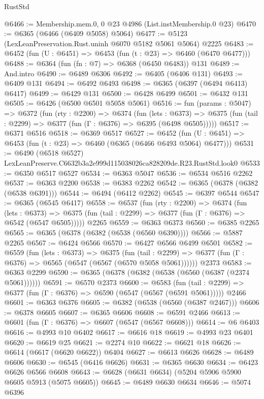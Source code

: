 \begin{lexlean}{RustStd}
\begin{coremodule}
@6466 := Membership.mem.{0, 0} @23 @4986 (List.instMembership.{0} @23)
@6470 := @6365 (@6466 (@6409 @5058) @5064)
@6477 := @5123 (LexLeanPreservation.Rust.uninh @6070 @5182 @5061 @5064) @2225
@6483 := @6452 (fun (U : @6451) => @6453 (fun (t : @23) => @6460 (@6470 @6477)))
@6488 := @6364 (fun (fn : @7) => @6368 (@6450 @6483)) @131
@6489 := And.intro
@6490 := @6489 @6306
@6492 := @6405 (@6406 @131)
@6493 := @6409 @131
@6494 := @6492 @6493
@6498 := @6365 (@6397 (@6494 @6413) @6417)
@6499 := @6429 @131
@6500 := @6428 @6499
@6501 := @6432 @131
@6505 := @6426 (@6500 @6501 @5058 @5061)
@6516 := fun (params : @5047) =>
  @6372
    (fun (rty : @2200) =>
    @6374
      (fun (lets : @6373) =>
      @6375 (fun (tail : @2299) => @6377 (fun (Γ : @6376) => @6395 (@6498 @6505)))))
@6517 := @6371 @6516
@6518 := @6369 @6517
@6527 := @6452 (fun (U : @6451) => @6453 (fun (t : @23) => @6460 (@6365 (@6466 @6493 @5064) @6477)))
@6531 := @6490 (@6518 @6527) LexLeanPreserve.C6632b3a2e999d115038026ca828209de.R23.RustStd.look0
@6533 := @6350 @6517 @6527
@6534 := @6363 @5047
@6536 := @6534 @6516 @2262
@6537 := @6363 @2200
@6538 := @6383 @2262
@6542 := @6365 (@6378 (@6382 (@6538 @6391)))
@6544 := @6494 (@6412 @2262)
@6545 := @6397 @6544
@6547 := @6365 (@6545 @6417)
@6558 := @6537
    (fun (rty : @2200) =>
    @6374
      (fun (lets : @6373) =>
      @6375 (fun (tail : @2299) => @6377 (fun (Γ : @6376) => @6542 (@6547 @6505)))))
    @2265
@6559 := @6363 @6373
@6560 := @6385 @2265
@6565 := @6365 (@6378 (@6382 (@6538 (@6560 @6390))))
@6566 := @5887 @2265
@6567 := @6424 @6566
@6570 := @6427 @6566 @6499 @6501
@6582 := @6559
    (fun (lets : @6373) =>
    @6375
      (fun (tail : @2299) => @6377 (fun (Γ : @6376) => @6565 (@6547 (@6567 (@6570 @5058 @5061))))))
    @2373
@6583 := @6363 @2299
@6590 := @6365 (@6378 (@6382 (@6538 (@6560 (@6387 (@2374 @5061))))))
@6591 := @6570 @2373
@6600 := @6583
    (fun (tail : @2299) => @6377 (fun (Γ : @6376) => @6590 (@6547 (@6567 (@6591 @5061)))))
    @2466
@6601 := @6363 @6376
@6605 := @6382 (@6538 (@6560 (@6387 @2467)))
@6606 := @6378 @6605
@6607 := @6365 @6606
@6608 := @6591 @2466
@6613 := @6601 (fun (Γ : @6376) => @6607 (@6547 (@6567 @6608)))
@6614 := @6 @6403
@6616 := @4993 @10 @6402
@6617 := @6616 @18
@6619 := @4993 @23 @6401
@6620 := @6619 @25
@6621 := @2274 @10
@6622 := @6621 @18
@6626 := @6614 (@6617 (@6620 @6622)) @6404
@6627 := @6613 @6626
@6628 := @6489 @6606
@6630 := @6545 (@6416 @6626)
@6631 := @6365 @6630
@6634 := @6423 @6626 @6566 @6608
@6643 := @6628 (@6631 @6634) (@5204 @5906 @5900 @6605 @5913 (@5075 @6605))
@6645 := @6489 @6630 @6634
@6646 := @5074 @6396

\end{coremodule}
\end{lexlean}

